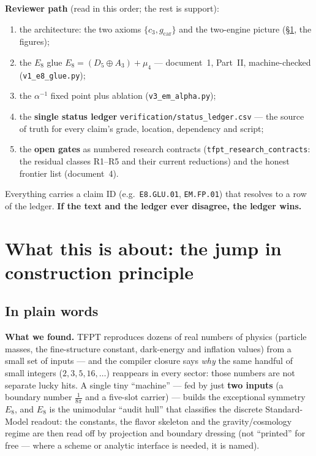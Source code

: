 \documentclass[11pt,a4paper]{article}
\newcommand{\cthree}{c_3}
\newcommand{\gcar}{g_{\mathrm{car}}}
\begin{document}
\noindent\textbf{Reviewer path} (read in this order; the rest is support):
\begin{enumerate}[leftmargin=1.7em,itemsep=1pt]
\item the architecture: the two axioms $\{\cthree,\gcar\}$ and the two-engine picture (\S\ref{sec:docmap}, the figures);
\item the $E_8$ glue $E_8{=}(D_5{\oplus}A_3){+}\mu_4$ --- document~1, Part~II, machine-checked (\texttt{v1\_e8\_glue.py});
\item the $\alpha^{-1}$ fixed point plus ablation (\texttt{v3\_em\_alpha.py});
\item the \textbf{single status ledger} \texttt{verification/status\_ledger.csv} --- the source of truth for every claim's grade, location, dependency and script;
\item the \textbf{open gates} as numbered research contracts (\texttt{tfpt\_research\_contracts}: the residual classes R1--R5 and their current reductions) and the honest frontier list (document~4).
\end{enumerate}
\noindent Everything carries a claim ID (e.g.\ \texttt{E8.GLU.01}, \texttt{EM.FP.01}) that resolves to a row of the
ledger. \textbf{If the text and the ledger ever disagree, the ledger wins.}

\section{What this is about: the jump in construction principle}\label{sec:docmap}

\subsection*{In plain words}

\noindent\textbf{What we found.} TFPT reproduces dozens of real numbers of physics (particle masses, the
fine-structure constant, dark-energy and inflation values) from a small set of inputs --- and the
compiler closure says \emph{why} the same handful of small integers ($2,3,5,16,\dots$) reappears in
every sector: those numbers are not separate lucky hits. A single tiny ``machine'' --- fed by just
\textbf{two inputs} (a boundary number $\tfrac1{8\pi}$ and a five-slot carrier) --- builds the
exceptional symmetry $E_8$, and $E_8$ is the unimodular ``audit hull'' that classifies the discrete
Standard-Model readout: the constants, the flavor skeleton and the gravity/cosmology regime are then
read off by projection and boundary dressing (not ``printed'' for free --- where a scheme or analytic
interface is needed, it is named).
\end{document}
